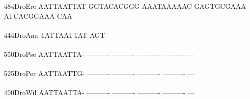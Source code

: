 \documentclass[11pt,twoside,reqno,a4paper]{article}
\begin{document}
{484\hspace*{1\charwidth}DroEre	AATTAATTAT	GGTACACGGG	AAATAAAAAC	GAGTGCGAAA	ATCACGGAAA	CAA\\
\hspace*{4\charwidth}\hspace*{7\charwidth}\hspace*{1\charwidth}\hspace*{1\charwidth}\hspace*{1\charwidth}\hspace*{1\charwidth}\hspace*{1\charwidth}\\
444\hspace*{1\charwidth}DroAna	TATTAATTAT	AGT-------	----------	----------	----------	---\\
\hspace*{4\charwidth}\hspace*{7\charwidth}\hspace*{1\charwidth}\hspace*{1\charwidth}\hspace*{1\charwidth}\hspace*{1\charwidth}\hspace*{1\charwidth}\\
550\hspace*{1\charwidth}DroPse	AATTAATTA-	----------	----------	----------	----------	---\\
\hspace*{4\charwidth}\hspace*{7\charwidth}\hspace*{1\charwidth}\hspace*{1\charwidth}\hspace*{1\charwidth}\hspace*{1\charwidth}\hspace*{1\charwidth}\\
525\hspace*{1\charwidth}DroPer	AATTAATTG-	----------	----------	----------	----------	---\\
\hspace*{4\charwidth}\hspace*{7\charwidth}\hspace*{1\charwidth}\hspace*{1\charwidth}\hspace*{1\charwidth}\hspace*{1\charwidth}\hspace*{1\charwidth}\\
490\hspace*{1\charwidth}DroWil	AATTAATTA-	----------	----------	----------	----------	---\\
}
\end{document}
